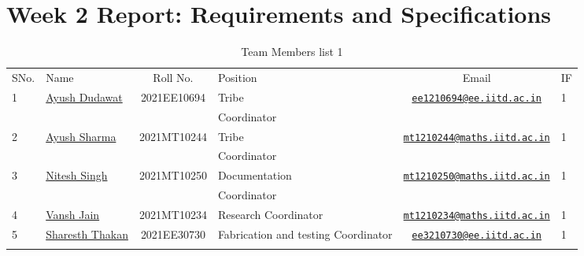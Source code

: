 \documentclass[table]{rapportCS}
\begin{document}
\section*{Week 2 Report: Requirements and Specifications}\label{sec:ourtribeone}
\begin{table}[h]
\centering
  \caption{Team Members list 1}
  \label{tab:team-members}
  
  \begin{tabular}{|p{.5cm}|p{3cm}|c|p{2.58cm}|c|p{0.3cm}|}
\hline
SNo. & Name & Roll No. & Position & Email & IF \\
\rowcolor{lightgray}
1 & \href{https://www.linkedin.com/in/ayush-dudawat-6b7a9b222/}{Ayush
Dudawat} & 2021EE10694 & Tribe &
\href{mailto:ee1210694@ee.iitd.ac.in}{\nolinkurl{ee1210694@ee.iitd.ac.in}}
& 1 \\
\rowcolor{lightgray}
&&&Coordinator&& \\
\rowcolor{lightgray}

2 & \href{https://www.linkedin.com/in/ayush-sharma-b01346224/}{Ayush
Sharma} & 2021MT10244 & Tribe  &
\href{mailto:mt1210244@maths.iitd.ac.in}{\nolinkurl{mt1210244@maths.iitd.ac.in}}
& 1 \\
\rowcolor{lightgray}
&&&Coordinator&&\\
\rowcolor{lightergray}

3 & \href{https://www.linkedin.com/in/nitesh-singh-a79a17223/}{Nitesh
Singh} & 2021MT10250 & Documentation   &
\href{mailto:mt1210250@maths.iitd.ac.in}{\nolinkurl{mt1210250@maths.iitd.ac.in}}
& 1 \\
\rowcolor{lightergray}
&&&Coordinator&&\\
\rowcolor{lightergray}

4 & \href{https://www.linkedin.com/in/vansh-jain-36569b225/}{Vansh Jain}
& 2021MT10234 & Research  Coordinator &
\href{mailto:mt1210234@maths.iitd.ac.in}{\nolinkurl{mt1210234@maths.iitd.ac.in}}
& 1 \\
\rowcolor{lightergray}
5 &
\href{https://www.linkedin.com/in/sharesth-thakan-249504250/}{Sharesth
Thakan} & 2021EE30730 & Fabrication and testing  Coordinator &
\href{mailto:ee3210730@ee.iitd.ac.in}{\nolinkurl{ee3210730@ee.iitd.ac.in}}

& 1 \\
\rowcolor{lightergray}


\end{tabular}
\end{table}
\end{document}
